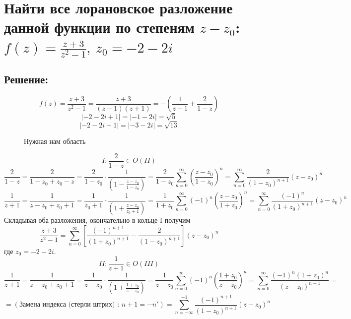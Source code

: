 \documentclass{article}
\begin{document}
	\section{Найти все лорановское разложение данной функции по степеням $z - z_0$: $f(z) = \frac{z+3}{z^2 - 1},\  z_0 = -2 -2i $}
	\subsection{Решение:}
	\[f(z) = \frac{z+3}{z^2 -1} = \frac{z+3}{(z-1)(z+1)} = - \left( \frac{1}{z+1} + \frac{2}{1-z} \right)\]
	\[|-2-2i+1| = |-1 -2i| = \sqrt{5}\]
	\[|-2-2i-1| = |-3 -2i| = \sqrt{13}\]
	\begin{figure}[h]
		\centering
		\caption{Нужная нам область}
	\end{figure}
	\[I: \frac{2}{1-z} \in O(II)\]
	\[\frac{2}{1-z} = \frac{2}{1-z_0+z_0-z} = \frac{2}{1-z_0 } \cdot\frac{1}{\left(1 - \frac{z-z_0 }{1-z_0 }\right)} = \frac{2}{1-z_0} \sum\limits_{n=0}^{\infty} \left(\frac{z-z_0}{1-z_0}\right)^n =\sum\limits_{n=0}^{\infty} \frac{2}{(1-z_0)^{n+1}} (z-z_0)^n\]
	\[\frac{1}{z+1} = \frac{1}{z - z_0 + z_0 + 1} = \frac{1}{z_0 +1} \cdot \frac{1}{\left(1 + \frac{z-z_0}{z_0+1}\right)} = \frac{1}{1+z_0} \sum\limits_{n=0}^\infty(-1)^n\left(\frac{z-z_0}{1+z_0}\right)^n = \sum\limits_{n=0}^\infty\frac{(-1)^n}{(1+z_0)^{n+1}}(z-z_0)^n\]
	Складывая оба разложения, окончательно в кольце I получим
	\[\frac{z+3}{z^2-1} = \sum\limits_{n=0}^\infty \left[\frac{(-1)^{n+1}}{(1+z_0)^{n+1}} - \frac{2}{(1-z_0)^{n+1}}\right](z-z_0)^n\]
	где $z_0 = -2-2i$.
	\[II: \frac{1}{z+1} \in O(III)\]
	\[\frac{1}{z+1} = \frac{1}{z-z_0 + z_0 +1} = \frac{1}{z-z_0}\cdot \frac{1}{\left(1+\frac{1+z_0}{z-z_0}\right)} = \frac{1}{z-z_0}\sum\limits_{n=0}^\infty (-1)^n \left(\frac{1+z_0}{z-z_0}\right)^n = \sum\limits_{n=0}^\infty  \frac{(-1)^n(1+z_0)^n}{(z-z_0)^{n+1}} =\]
	\[= \left(\text{Замена индекса (стерли штрих) : } n+1=-n'\right) = \sum\limits_{n=-\infty}^{-1} \frac{(-1)^{n+1}}{(1-z_0)^{n+1}}(z-z_0)^n\]
	
\end{document}

